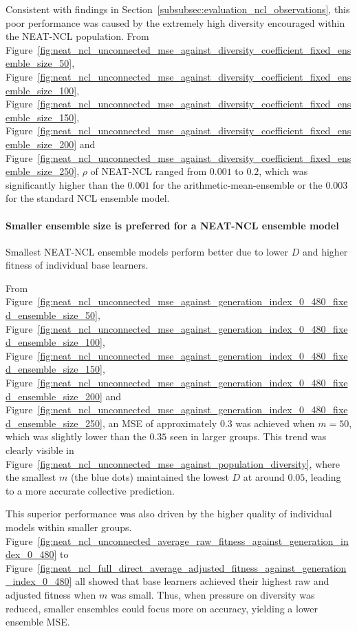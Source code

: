 Consistent with findings in Section~\ref{subsubsec:evaluation_ncl_observations}, this poor performance was caused by the extremely high diversity encouraged within the NEAT-NCL population. From Figure~\ref{fig:neat_ncl_unconnected_mse_against_diversity_coefficient_fixed_ensemble_size_50}, Figure~\ref{fig:neat_ncl_unconnected_mse_against_diversity_coefficient_fixed_ensemble_size_100}, Figure~\ref{fig:neat_ncl_unconnected_mse_against_diversity_coefficient_fixed_ensemble_size_150}, Figure~\ref{fig:neat_ncl_unconnected_mse_against_diversity_coefficient_fixed_ensemble_size_200} and Figure~\ref{fig:neat_ncl_unconnected_mse_against_diversity_coefficient_fixed_ensemble_size_250}, $\rho$ of NEAT-NCL ranged from $0.001$ to $0.2$, which was significantly higher than the $0.001$ for the arithmetic-mean-ensemble or the $0.003$ for the standard NCL ensemble model. 

\paragraph{Smaller ensemble size is preferred for a NEAT-NCL ensemble model}
Smallest NEAT-NCL ensemble models perform better due to lower $D$ and higher fitness of individual base learners. 

From Figure~\ref{fig:neat_ncl_unconnected_mse_against_generation_index_0_480_fixed_ensemble_size_50}, Figure~\ref{fig:neat_ncl_unconnected_mse_against_generation_index_0_480_fixed_ensemble_size_100}, Figure~\ref{fig:neat_ncl_unconnected_mse_against_generation_index_0_480_fixed_ensemble_size_150}, Figure~\ref{fig:neat_ncl_unconnected_mse_against_generation_index_0_480_fixed_ensemble_size_200} and Figure~\ref{fig:neat_ncl_unconnected_mse_against_generation_index_0_480_fixed_ensemble_size_250}, an MSE of approximately $0.3$ was achieved when $m = 50$, which was slightly lower than the $0.35$ seen in larger groups. This trend was clearly visible in Figure~\ref{fig:neat_ncl_unconnected_mse_against_population_diversity}, where the smallest $m$ (the blue dots) maintained the lowest $D$ at around $0.05$, leading to a more accurate collective prediction. 

This superior performance was also driven by the higher quality of individual models within smaller groups. Figure~\ref{fig:neat_ncl_unconnected_average_raw_fitness_against_generation_index_0_480} to Figure~\ref{fig:neat_ncl_full_direct_average_adjusted_fitness_against_generation_index_0_480} all showed that base learners achieved their highest raw and adjusted fitness when $m$ was small. Thus, when pressure on diversity was reduced, smaller ensembles could focus more on accuracy, yielding a lower ensemble MSE. 

